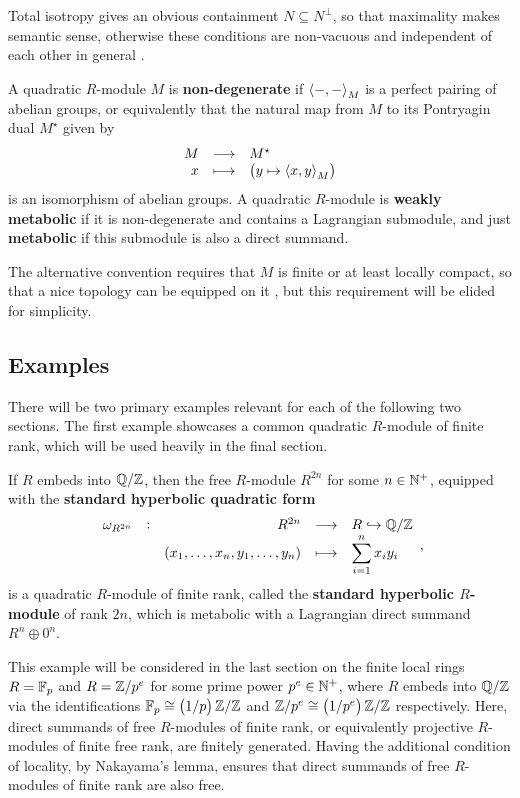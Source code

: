\begin{remark}
Total isotropy gives an obvious containment $ N \subseteq N^\perp $, so that maximality makes semantic sense, otherwise these conditions are non-vacuous and independent of each other in general \cite[Remark 2.3]{PR12}.
\end{remark}

\pagebreak

\begin{definition}
A quadratic $ R $-module $ M $ is \textbf{non-degenerate} if $ \left\langle -, - \right\rangle_M $ is a perfect pairing of abelian groups, or equivalently that the natural map from $ M $ to its Pontryagin dual $ M^\star $ given by
$$ \function{M}{M^\star}{x}{\br{y \mapsto \abr{x, y}_M}} $$
is an isomorphism of abelian groups. A quadratic $ R $-module is \textbf{weakly metabolic} if it is non-degenerate and contains a Lagrangian submodule, and just \textbf{metabolic} if this submodule is also a direct summand.
\end{definition}

\begin{remark}
The alternative convention requires that $ M $ is finite or at least locally compact, so that a nice topology can be equipped on it \cite[Definition 2.13]{PR12}, but this requirement will be elided for simplicity.
\end{remark}

\subsection{Examples}

There will be two primary examples relevant for each of the following two sections. The first example showcases a common quadratic $ R $-module of finite rank, which will be used heavily in the final section.

\begin{example}
If $ R $ embeds into $ \mathbb{Q} / \mathbb{Z} $, then the free $ R $-module $ R^{2n} $ for some $ n \in \mathbb{N}^+ $, equipped with the \textbf{standard hyperbolic quadratic form}
$$ \function[\omega_{R^{2n}}]{R^{2n}}{R \hookrightarrow \QQ / \ZZ}{\br{x_1, \dots, x_n, y_1, \dots, y_n}}{\displaystyle\sum_{i = 1}^n x_iy_i}, $$
is a quadratic $ R $-module of finite rank, called the \textbf{standard hyperbolic $ R $-module} of rank $ 2n $, which is metabolic with a Lagrangian direct summand $ R^n \oplus 0^n $.
\end{example}

This example will be considered in the last section on the finite local rings $ R = \mathbb{F}_p $ and $ R = \mathbb{Z} / p^e $ for some prime power $ p^e \in \mathbb{N}^+ $, where $ R $ embeds into $ \mathbb{Q} / \mathbb{Z} $ via the identifications $ \FF_p \cong \br{1 / p}\ZZ / \ZZ $ and $ \ZZ / p^e \cong \br{1 / p^e}\ZZ / \ZZ $ respectively. Here, direct summands of free $ R $-modules of finite rank, or equivalently projective $ R $-modules of finite free rank, are finitely generated. Having the additional condition of locality, by Nakayama's lemma, ensures that direct summands of free $ R $-modules of finite rank are also free.

